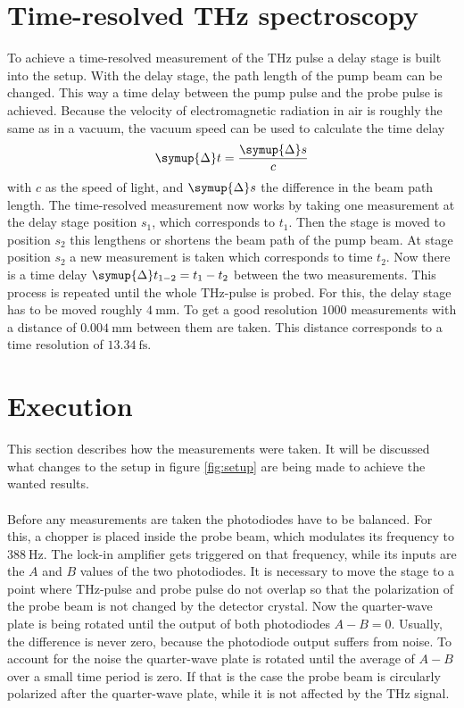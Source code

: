 \section{Time-resolved THz spectroscopy}
\label{sec:time_domain}
To achieve a time-resolved measurement of the $\si{\tera\hertz}$ pulse a delay stage is built into the setup.
With the delay stage, the path length of the pump beam can be changed.
This way a time delay between the pump pulse and the probe pulse is achieved.
Because the velocity of electromagnetic radiation in air is roughly the same as in a vacuum, the vacuum speed can be used to calculate the time delay   
\begin{equation}
    \symup{\Delta} t = \frac{\symup{\Delta} s}{c}
\end{equation}
with $c$ as the speed of light, and $\symup{\Delta} s$ the difference in the beam path length.
The time-resolved measurement now works by taking one measurement at the delay stage position $s_1$, which corresponds to $t_1$.
Then the stage is moved to position $s_2$ this lengthens or shortens the beam path of the pump beam.
At stage position $s_2$ a new measurement is taken which corresponds to time $t_2$.
Now there is a time delay $\symup{\Delta} t_{1-2} = t_1 - t_2$ between the two measurements.
This process is repeated until the whole $\si{\tera\hertz}$-pulse is probed.
For this, the delay stage has to be moved roughly $\SI{4}{\milli\meter}$.
To get a good resolution $1000$ measurements with a distance of $\SI{0.004}{\milli\meter}$ between them are taken.
This distance corresponds to a time resolution of $\SI{13.34}{\femto\second}$.

\section{Execution}
\label{sec:execution}
This section describes how the measurements were taken. 
It will be discussed what changes to the setup in figure \ref{fig:setup} are being made to achieve the wanted results.
\\\\
Before any measurements are taken the photodiodes have to be balanced.
For this, a chopper is placed inside the probe beam, which modulates its frequency to $\SI{388}{\hertz}$.
The lock-in amplifier gets triggered on that frequency, while its inputs are the $A$ and $B$ values of the two photodiodes.
It is necessary to move the stage to a point where $\si{\tera\hertz}$-pulse and probe pulse do not overlap so that the polarization of the probe beam is not changed by the detector crystal.
Now the quarter-wave plate is being rotated until the output of both photodiodes $A-B = 0$.
Usually, the difference is never zero, because the photodiode output suffers from noise.
To account for the noise the quarter-wave plate is rotated until the average of $A-B$ over a small time period is zero.
If that is the case the probe beam is circularly polarized after the quarter-wave plate, while it is not affected by the $\si{\tera\hertz}$ signal.
